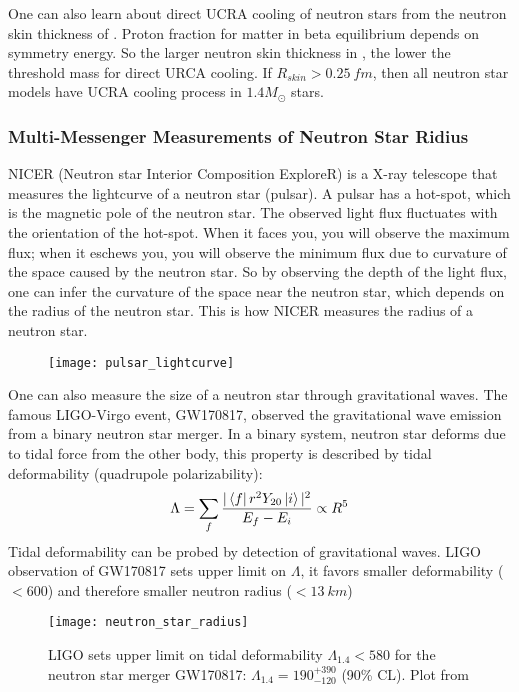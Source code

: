 One can also learn about direct UCRA cooling of neutron stars from the
neutron skin thickness of \Pb. Proton fraction for matter in beta equilibrium 
depends on symmetry energy. So the larger neutron skin thickness in \Pb, the
lower the threshold mass for direct URCA cooling. If $R_{skin} > 0.25\ fm$, then
all neutron star models have UCRA cooling process in $1.4 M_{\odot}$ stars.
\subsubsection{Multi-Messenger Measurements of Neutron Star Ridius}
NICER (Neutron star Interior Composition ExploreR) is a X-ray telescope that
measures the lightcurve of a neutron star (pulsar). A pulsar has a hot-spot, which
is the magnetic pole of the neutron star. The observed light flux fluctuates 
with the orientation of the hot-spot. When it faces you, you will observe the 
maximum flux; when it eschews you, you will observe the minimum flux due to 
curvature of the space caused by the neutron star. So by observing 
the depth of the light flux, one can infer the curvature of the space near the
neutron star, which depends on the radius of the neutron star. This is how NICER
measures the radius of a neutron star.
\begin{figure}[H]
    \centering
    \texttt{[image: pulsar\_lightcurve]}
\end{figure}

One can also measure the size of a neutron star through gravitational waves.
The famous LIGO-Virgo event, GW170817, observed the gravitational wave emission 
from a binary neutron star merger. In a binary system, neutron star deforms
due to tidal force from the other body, this property is described by 
tidal deformability (quadrupole polarizability):
\begin{equation}
    \Lambda = \sum_f \frac{|\bra{f}r^2Y_{20}\ket{i}|^2}{E_f - E_i} \propto R^5 
\end{equation}
Tidal deformability can be probed by detection of gravitational waves.
LIGO observation of GW170817 sets upper limit on $\Lambda$, it favors smaller 
deformability ($<600$) and therefore smaller neutron radius ($<13\ km$)

\begin{figure}
    \centering
    \texttt{[image: neutron\_star\_radius]}
    \caption{LIGO sets upper limit on tidal deformability $\Lambda_{1.4} < 580$ 
    for the neutron star merger GW170817: $\Lambda_{1.4} = 190 ^{+390}_{-120}$ (90\% CL).
    Plot from \cite{PhysRevLett.126.172503}}
\end{figure}

